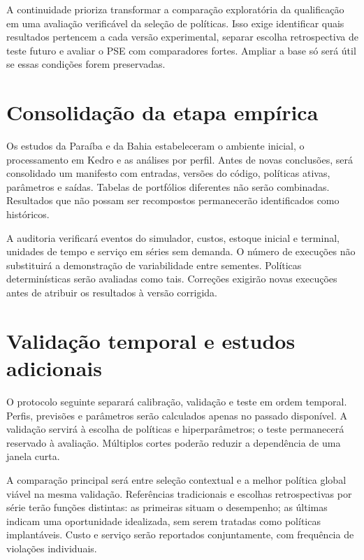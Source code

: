 
A continuidade prioriza transformar a comparação exploratória da qualificação em uma avaliação verificável da seleção de políticas. Isso exige identificar quais resultados pertencem a cada versão experimental, separar escolha retrospectiva de teste futuro e avaliar o PSE com comparadores fortes. Ampliar a base só será útil se essas condições forem preservadas.

\section{Consolidação da etapa empírica}

Os estudos da Paraíba e da Bahia estabeleceram o ambiente inicial, o processamento em Kedro e as análises por perfil. Antes de novas conclusões, será consolidado um manifesto com entradas, versões do código, políticas ativas, parâmetros e saídas. Tabelas de portfólios diferentes não serão combinadas. Resultados que não possam ser recompostos permanecerão identificados como históricos.

A auditoria verificará eventos do simulador, custos, estoque inicial e terminal, unidades de tempo e serviço em séries sem demanda. O número de execuções não substituirá a demonstração de variabilidade entre sementes. Políticas determinísticas serão avaliadas como tais. Correções exigirão novas execuções antes de atribuir os resultados à versão corrigida.

\section{Validação temporal e estudos adicionais}
\label{sec:estudos_caso_adicionais}

O protocolo seguinte separará calibração, validação e teste em ordem temporal. Perfis, previsões e parâmetros serão calculados apenas no passado disponível. A validação servirá à escolha de políticas e hiperparâmetros; o teste permanecerá reservado à avaliação. Múltiplos cortes poderão reduzir a dependência de uma janela curta.

A comparação principal será entre seleção contextual e a melhor política global viável na mesma validação. Referências tradicionais e escolhas retrospectivas por série terão funções distintas: as primeiras situam o desempenho; as últimas indicam uma oportunidade idealizada, sem serem tratadas como políticas implantáveis. Custo e serviço serão reportados conjuntamente, com frequência de violações individuais.

